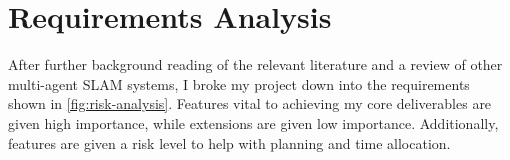 \section{Requirements Analysis}
\label{sec:requirements-analysis}
After further background reading of the relevant literature and a review of other multi-agent SLAM systems, I broke my project down into the requirements shown in \autoref{fig:risk-analysis}. Features vital to achieving my core deliverables are given high importance, while extensions are given low importance. Additionally, features are given a risk level to help with planning and time allocation.


\begin{figure}[h]
    \centering
\end{figure}
